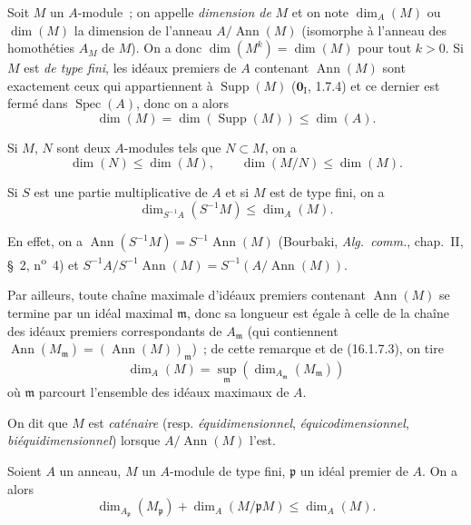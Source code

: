 \begin{env}[16.1.7]
\label{0.16.1.7-fr}
Soit $M$ un $A$-module~; on appelle \emph{dimension de} $M$ et on note
$\dim_A(M)$ ou $\dim(M)$ la dimension de l'anneau $A/\operatorname{Ann}(M)$
(isomorphe à l'anneau des homothéties $A_M$ de $M$). On a donc
$\dim(M^k)=\dim(M)$ pour tout $k>0$. Si $M$ est \emph{de type fini}, les idéaux
premiers de $A$ contenant $\operatorname{Ann}(M)$ sont exactement ceux qui
appartiennent à $\operatorname{Supp}(M)$ ($\mathbf{0}_{\mathrm I}$, 1.7.4) et ce
dernier est fermé dans $\operatorname{Spec}(A)$, donc on a alors
\[
\label{0.16.1.7.1-fr}
  \dim(M)=\dim(\operatorname{Supp}(M))\leq\dim(A).
\tag{16.1.7.1}
\]

Si $M$, $N$ sont deux $A$-modules tels que $N\subset M$, on a
\[
\label{0.16.1.7.2-fr}
  \dim(N)\leq\dim(M),\qquad \dim(M/N)\leq\dim(M).
\tag{16.1.7.2}
\]

Si $S$ est une partie multiplicative de $A$ et si $M$ est de type fini, on a
\[
\label{0.16.1.7.3-fr}
  \dim_{S^{-1}A}(S^{-1}M)\leq\dim_A(M).
\tag{16.1.7.3}
\]

En effet, on a
$\operatorname{Ann}(S^{-1}M)=S^{-1}\operatorname{Ann}(M)$ (Bourbaki,
\emph{Alg.~comm.}, chap.~II, \S~2, n\textsuperscript{o}~4) et
$S^{-1}A/S^{-1}\operatorname{Ann}(M)=S^{-1}(A/\operatorname{Ann}(M))$.

Par ailleurs, toute chaîne maximale d'idéaux premiers contenant
$\operatorname{Ann}(M)$ se termine par un idéal maximal $\mathfrak{m}$, donc
sa longueur est égale à celle de la chaîne des idéaux premiers correspondants
de $A_{\mathfrak{m}}$ (qui contiennent
$\operatorname{Ann}(M_{\mathfrak{m}})=(\operatorname{Ann}(M))_{\mathfrak{m}}$)~;
de cette remarque et de (16.1.7.3), on tire
\[
\label{0.16.1.7.4-fr}
  \dim_A(M)=\sup_{\mathfrak{m}}
  (\dim_{A_{\mathfrak{m}}}(M_{\mathfrak{m}}))
\tag{16.1.7.4}
\]
où $\mathfrak{m}$ parcourt l'ensemble des idéaux maximaux de $A$.

On dit que $M$ est \emph{caténaire} (resp. \emph{équidimensionnel}, \emph{équicodimensionnel},
\emph{biéquidimensionnel}) lorsque $A/\operatorname{Ann}(M)$ l'est.
\end{env}

\begin{proposition}[16.1.8]
\label{0.16.1.8-fr}
Soient $A$ un anneau, $M$ un $A$-module de type fini, $\mathfrak{p}$ un idéal
premier de $A$. On a alors
\[
\label{0.16.1.8.1-fr}
  \dim_{A_{\mathfrak{p}}}(M_{\mathfrak{p}})
  +\dim_A(M/\mathfrak{p}M)\leq\dim_A(M).
\tag{16.1.8.1}
\]
\end{proposition}


